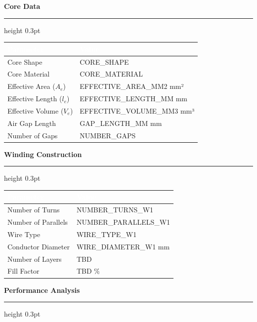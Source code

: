 \documentclass[10pt,a4paper]{article}
\newcommand{\sectiontitle}[1]{%
    \vspace{3mm}%
    {\large\bfseries\color{primary}#1}%
    \vspace{1mm}%
    \hrule height 0.3pt%
    \vspace{2mm}%
}
\begin{document}
\begin{minipage}[t]{0.48\textwidth}
\sectiontitle{Core Data}
{\footnotesize
\begin{tabular}{|L{35mm}|L{25mm}|}
\hline
{}
\textcolor{white}{\textbf{Parameter}} & \textcolor{white}{\textbf{Value}} \\
\hline
Core Shape & {{CORE_SHAPE}} \\
Core Material & {{CORE_MATERIAL}} \\
Effective Area ($A_e$) & {{EFFECTIVE_AREA_MM2}} mm² \\
Effective Length ($l_e$) & {{EFFECTIVE_LENGTH_MM}} mm \\
Effective Volume ($V_e$) & {{EFFECTIVE_VOLUME_MM3}} mm³ \\
Air Gap Length & {{GAP_LENGTH_MM}} mm \\
Number of Gaps & {{NUMBER_GAPS}} \\
\hline
\end{tabular}
}
\end{minipage}
\hfill
\begin{minipage}[t]{0.48\textwidth}
\sectiontitle{Winding Construction}
{\footnotesize
\begin{tabular}{|L{35mm}|L{25mm}|}
\hline
{}
\textcolor{white}{\textbf{Parameter}} & \textcolor{white}{\textbf{Value}} \\
\hline
Number of Turns & {{NUMBER_TURNS_W1}} \\
Number of Parallels & {{NUMBER_PARALLELS_W1}} \\
Wire Type & {{WIRE_TYPE_W1}} \\
Conductor Diameter & {{WIRE_DIAMETER_W1}} mm \\
Number of Layers & TBD \\
Fill Factor & TBD \% \\
\hline
\end{tabular}
}
\end{minipage}

\vspace{4mm}

\sectiontitle{Performance Analysis}
\end{document}
